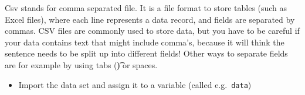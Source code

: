 \documentclass[
  letterpaper,
  DIV=11,
  numbers=noendperiod]{scrreprt}
\providecommand{\tightlist}{%
  \setlength{\itemsep}{0pt}\setlength{\parskip}{0pt}}\usepackage{longtable,booktabs,array}
\begin{document}
\begin{tcolorbox}[enhanced jigsaw, arc=.35mm, left=2mm, titlerule=0mm, rightrule=.15mm, colframe=quarto-callout-tip-color-frame, coltitle=black, colback=white, opacityback=0, bottomtitle=1mm, bottomrule=.15mm, colbacktitle=quarto-callout-tip-color!10!white, breakable, title=\textcolor{quarto-callout-tip-color}{\faLightbulb}\hspace{0.5em}{Answer}, toptitle=1mm, toprule=.15mm, opacitybacktitle=0.6, leftrule=.75mm]

Csv stands for comma separated file. It is a file format to store tables
(such as Excel files), where each line represents a data record, and
fields are separated by commas. CSV files are commonly used to store
data, but you have to be careful if your data contains text that might
include comma's, because it will think the sentence needs to be split up
into different fields! Other ways to separate fields are for example by
using tabs (\t) or spaces.

\end{tcolorbox}

\begin{itemize}
\tightlist
\item
  Import the data set and assign it to a variable (called
  e.g.~\texttt{data})\\
\end{itemize}
\end{document}
